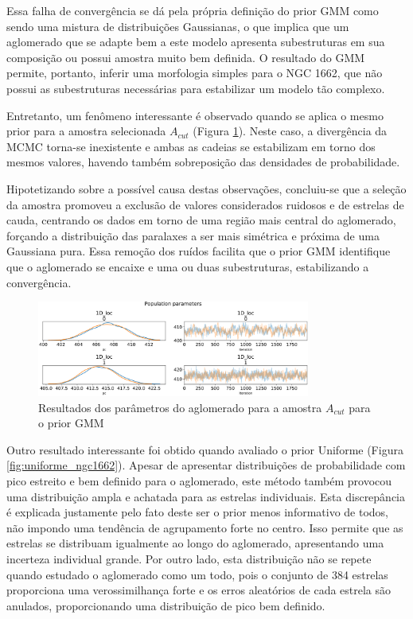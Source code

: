 \documentclass[12pt]{projeto}
\begin{document}
Essa falha de convergência se dá pela própria definição do prior GMM como sendo uma mistura de distribuições Gaussianas, o que implica que um aglomerado que se adapte bem a este modelo apresenta subestruturas em sua composição ou possui amostra muito bem definida. O resultado do GMM permite, portanto, inferir uma morfologia simples para o NGC 1662, que não possui as subestruturas necessárias para estabilizar um modelo tão complexo.

Entretanto, um fenômeno interessante é observado quando se aplica o mesmo prior para a amostra selecionada \(A_{cut}\) (Figura \ref{fig:gmm_ngc1662cut}). Neste caso, a divergência da MCMC torna-se inexistente e ambas as cadeias se estabilizam em torno dos mesmos valores, havendo também sobreposição das densidades de probabilidade. 

Hipotetizando sobre a possível causa destas observações, concluiu-se que a seleção da amostra promoveu a exclusão de valores considerados ruidosos e de estrelas de cauda, centrando os dados em torno de uma região mais central do aglomerado, forçando a distribuição das paralaxes a ser mais simétrica e próxima de uma Gaussiana pura. Essa remoção dos ruídos facilita que o prior GMM identifique que o aglomerado se encaixe e uma ou duas subestruturas, estabilizando a convergência.

\begin{figure}[ht]
\centering
\includegraphics[width= 0.8\textwidth]{gmm_ngc1662cut.png}
\caption{\label{fig:gmm_ngc1662cut} Resultados dos parâmetros do aglomerado para a amostra \(A_{cut}\) para o prior GMM}
\end{figure}

Outro resultado interessante foi obtido quando avaliado o prior Uniforme (Figura \ref{fig:uniforme_ngc1662}). Apesar de apresentar distribuições de probabilidade com pico estreito e bem definido para o aglomerado, este método também provocou uma distribuição ampla e achatada para as estrelas individuais. Esta discrepância é explicada justamente pelo fato deste ser o prior menos informativo de todos, não impondo uma tendência de agrupamento forte no centro. Isso permite que as estrelas se distribuam igualmente ao longo do aglomerado, apresentando uma incerteza individual grande. Por outro lado, esta distribuição não se repete quando estudado o aglomerado como um todo, pois o conjunto de 384 estrelas proporciona uma verossimilhança forte e os erros aleatórios de cada estrela são anulados, proporcionando uma distribuição de pico bem definido.
\end{document}
